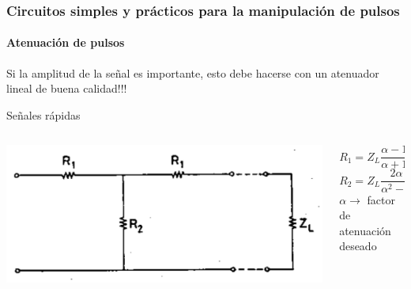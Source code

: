 \documentclass{beamer}
\begin{document}
\begin{frame}
\frametitle{Circuitos simples y prácticos para la manipulación de
pulsos}
\framesubtitle{{\color{blue}Atenuación de pulsos}}
\begin{alertblock}{}
Si la amplitud de la señal es importante, esto debe hacerse con un atenuador
lineal de buena calidad!!!
\end{alertblock}
\begin{block}{Señales rápidas}
\begin{columns}
\begin{column}{0.5\textwidth}
\begin{center}
\includegraphics[width=\textwidth]{d2/att_for_fast_signal}
\end{center}
\end{column}
\begin{column}{0.5\textwidth}
$$R_1 = Z_L \frac{\alpha - 1}{\alpha + 1}$$ 
$$R_2 = Z_L \frac{2 \alpha}{\alpha^2 - 1}$$ 
$\alpha \rightarrow$ factor de atenuación deseado 
\end{column}
\end{columns}
\end{block}
\end{frame}
\end{document}

